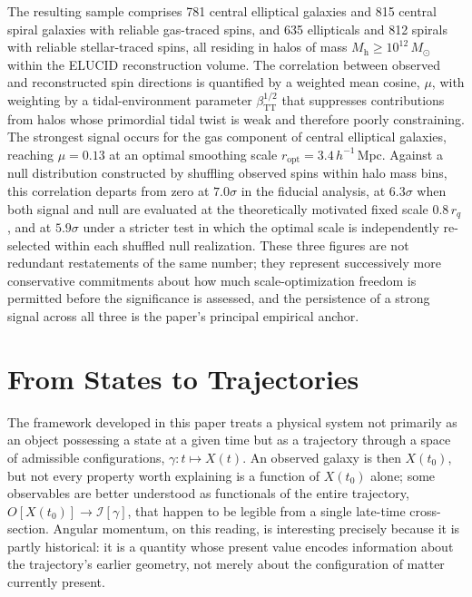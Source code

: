 \documentclass[11pt]{article}
\begin{document}
The resulting sample comprises 781 central elliptical galaxies and 815 central spiral galaxies with reliable gas-traced spins, and 635 ellipticals and 812 spirals with reliable stellar-traced spins, all residing in halos of mass $M_{\mathrm h} \geq 10^{12}\,M_\odot$ within the ELUCID reconstruction volume. The correlation between observed and reconstructed spin directions is quantified by a weighted mean cosine, $\mu$, with weighting by a tidal-environment parameter $\beta_{\mathrm{TT}}^{1/2}$ that suppresses contributions from halos whose primordial tidal twist is weak and therefore poorly constraining. The strongest signal occurs for the gas component of central elliptical galaxies, reaching $\mu = 0.13$ at an optimal smoothing scale $r_{\mathrm{opt}} = 3.4\,h^{-1}\,\mathrm{Mpc}$. Against a null distribution constructed by shuffling observed spins within halo mass bins, this correlation departs from zero at $7.0\sigma$ in the fiducial analysis, at $6.3\sigma$ when both signal and null are evaluated at the theoretically motivated fixed scale $0.8\,r_q$, and at $5.9\sigma$ under a stricter test in which the optimal scale is independently re-selected within each shuffled null realization. These three figures are not redundant restatements of the same number; they represent successively more conservative commitments about how much scale-optimization freedom is permitted before the significance is assessed, and the persistence of a strong signal across all three is the paper's principal empirical anchor.

\section{From States to Trajectories}

The framework developed in this paper treats a physical system not primarily as an object possessing a state at a given time but as a trajectory through a space of admissible configurations, $\gamma: t \mapsto X(t)$. An observed galaxy is then $X(t_0)$, but not every property worth explaining is a function of $X(t_0)$ alone; some observables are better understood as functionals of the entire trajectory, $O[X(t_0)] \to \mathcal I[\gamma]$, that happen to be legible from a single late-time cross-section. Angular momentum, on this reading, is interesting precisely because it is partly historical: it is a quantity whose present value encodes information about the trajectory's earlier geometry, not merely about the configuration of matter currently present.
\end{document}
